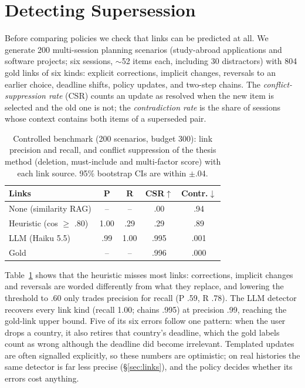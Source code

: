 \documentclass[11pt]{article}
\begin{document}
\section{Detecting Supersession}
\label{sec:synthetic}

Before comparing policies we check that links can be predicted at all. We generate 200 multi-session
planning scenarios (study-abroad applications and software projects; six sessions, ${\sim}$52 items
each, including 30 distractors) with 804 gold links of six kinds: explicit corrections, implicit
changes, reversals to an earlier choice, deadline shifts, policy updates, and two-step chains. The
\emph{conflict-suppression rate} (CSR) counts an update as resolved when the new item is selected and
the old one is not; the \emph{contradiction rate} is the share of sessions whose context contains
both items of a superseded pair.

\begin{table}[t]
\centering
\small
\setlength{\tabcolsep}{4pt}
\begin{tabular}{lcccc}
\toprule
Links & P & R & CSR$\uparrow$ & Contr.$\downarrow$ \\
\midrule
None (similarity RAG) & -- & -- & .00 & .94 \\
Heuristic (cos $\geq$ .80) & 1.00 & .29 & .29 & .89 \\
LLM (Haiku 5.5) & .99 & 1.00 & .995 & .001 \\
Gold & -- & -- & .996 & .000 \\
\bottomrule
\end{tabular}
\caption{Controlled benchmark (200 scenarios, budget 300): link precision and recall, and conflict
suppression of the thesis method (deletion, must-include and multi-factor score) with each link source. 95\% bootstrap CIs are within $\pm$.04.}
\label{tab:synthetic}
\end{table}

Table~\ref{tab:synthetic} shows that the heuristic misses most links: corrections, implicit changes and
reversals are worded differently from what they replace, and lowering the threshold to .60 only trades
precision for recall (P .59, R .78). The LLM detector recovers every link kind (recall 1.00; chains
.995) at precision .99, reaching the gold-link upper bound. Five of its six errors follow one pattern:
when the user drops a country, it also retires that country's deadline, which the gold labels count as
wrong although the deadline did become irrelevant. Templated updates are often signalled explicitly,
so these numbers are optimistic; on real histories the same detector is far less precise
(\S\ref{sec:links}), and the policy decides whether its errors cost anything.
\end{document}
